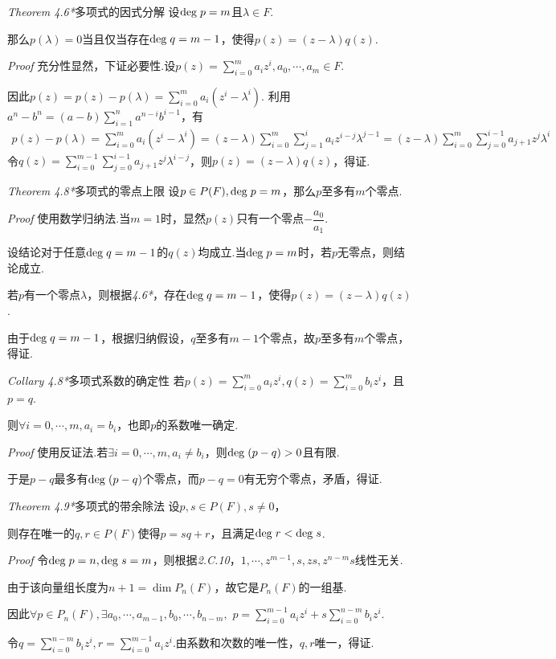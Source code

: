 \textit{Theorem 4.6*}{\kaishu 多项式的因式分解}
设\(\mathrm{deg \;} p=m\)且\(\lambda \in F\).

那么\(p(\lambda)=0\)当且仅当存在\(\mathrm{deg \;} q=m-1\)，使得\(p(z)=(z-\lambda)q(z)\).

\textit{Proof}
充分性显然，下证必要性.设\(p(z)=\sum_{i=0}^m a_iz^i,a_0,\cdots,a_m \in F\).

因此\(p(z)=p(z)-p(\lambda)=\sum_{i=0}^m a_i(z^i-\lambda^i)\).
利用\(a^n-b^n=(a-b)\sum_{i=1}^n a^{n-i}b^{i-1}\)，有
    \begin{align*}
        p(z)-p(\lambda)=\sum_{i=0}^m a_i(z^i-\lambda^i)
                       =(z-\lambda)\sum_{i=0}^m \sum_{j=1}^i a_iz^{i-j}\lambda^{j-1}
                       =(z-\lambda)\sum_{i=0}^m \sum_{j=0}^{i-1} a_{j+1}z^j\lambda^i
    \end{align*}
令\(q(z)=\sum_{i=0}^{m-1} \sum_{j=0}^{i-1} a_{j+1}z^j\lambda^{i-j}\)，则\(p(z)=(z-\lambda)q(z)\)，得证.

\hspace*{\fill}

\textit{Theorem 4.8*}{\kaishu 多项式的零点上限}
设\(p \in P(F),\mathrm{deg \;} p=m\)，那么\(p\)至多有\(m\)个零点.

\textit{Proof}
使用数学归纳法.当\(m=1\)时，显然\(p(z)\)只有一个零点\(-\dfrac{a_0}{a_1}\).

设结论对于任意\(\mathrm{deg \;} q=m-1\)的\(q(z)\)均成立.当\(\mathrm{deg \;} p=m\)时，若\(p\)无零点，则结论成立.

若\(p\)有一个零点\(\lambda\)，则根据\textit{4.6*}，存在\(\mathrm{deg \;} q=m-1\)，使得\(p(z)=(z-\lambda)q(z)\).

由于\(\mathrm{deg \;} q=m-1\)，根据归纳假设，\(q\)至多有\(m-1\)个零点，故\(p\)至多有\(m\)个零点，得证.

\hspace*{\fill}

\textit{Collary 4.8*}{\kaishu 多项式系数的确定性}
若\(p(z)=\sum_{i=0}^m a_iz^i,q(z)=\sum_{i=0}^m b_iz^i\)，且\(p=q\).

则\(\forall i=0,\cdots,m,a_i=b_i\)，也即\(p\)的系数唯一确定.

\textit{Proof}
使用反证法.若\(\exists i=0,\cdots,m,a_i \ne b_i\)，则\(\mathrm{deg \;} (p-q)>0\)且有限.

于是\(p-q\)最多有\(\mathrm{deg \;} (p-q)\)个零点，而\(p-q=0\)有无穷个零点，矛盾，得证.

\hspace*{\fill}

\textit{Theorem 4.9*}{\kaishu 多项式的带余除法}
设\(p,s \in P(F),s \ne 0\)，

则存在唯一的\(q,r \in P(F)\)使得\(p=sq+r\)，且满足\(\mathrm{deg \;} r<\mathrm{deg \;} s\).

\textit{Proof}
令\(\mathrm{deg \;} p=n,\mathrm{deg \;} s=m\)，则根据\textit{2.C.10}，\(1,\cdots,z^{m-1},s,zs,z^{n-m}s\)线性无关.

由于该向量组长度为\(n+1=\dim P_n(F)\)，故它是\(P_n(F)\)的一组基.

因此\(\forall p \in P_n(F),\exists a_0,\cdots,a_{m-1},b_0,\cdots,b_{n-m},\)
\(p=\sum_{i=0}^{m-1}a_iz^i+s\sum_{i=0}^{n-m}b_iz^i\).

令\(q=\sum_{i=0}^{n-m}b_iz^i,r=\sum_{i=0}^{m-1}a_iz^i\).由系数和次数的唯一性，\(q,r\)唯一，得证.

